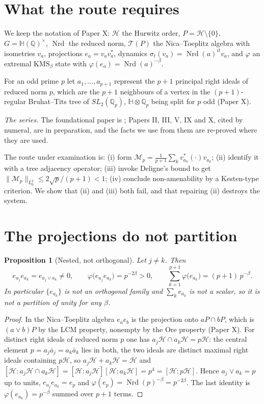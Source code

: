 \documentclass[11pt]{amsart}
\numberwithin{equation}{section}
\newtheorem{proposition}[theorem]{Proposition}
\theoremstyle{definition}
\theoremstyle{remark}
\newcommand{\Q}{\mathbb{Q}}
\newcommand{\HH}{\mathbb{H}}
\newcommand{\cH}{\mathcal{H}}
\newcommand{\cT}{\mathcal{T}}
\newcommand{\cM}{\mathcal{M}}
\newcommand{\Nrd}{\operatorname{Nrd}}
\begin{document}
\maketitle

\section{What the route requires}

We keep the notation of Paper X: $\cH$ the Hurwitz order, $P=\cH\setminus\{0\}$,
$G=\HH(\Q)^\times$, $\Nrd$ the reduced norm, $\cT(P)$ the Nica--Toeplitz algebra with
isometries $v_a$, projections $e_a=v_av_a^*$, dynamics $\sigma_t(v_a)=\Nrd(a)^{it}v_a$, and
$\varphi$ an extremal $\mathrm{KMS}_\beta$ state with $\varphi(e_a)=\Nrd(a)^{-\beta}$.

For an odd prime $p$ let $a_1,\dots,a_{p+1}$ represent the $p+1$ principal right ideals of
reduced norm $p$, which are the $p+1$ neighbours of a vertex in the $(p+1)$-regular
Bruhat--Tits tree of $SL_2(\Q_p)$, $\HH\otimes\Q_p$ being split for $p$ odd (Paper X).

\emph{The series.} The foundational paper is \cite{Main}; Papers II, III, V, IX and X, cited
by numeral, are in preparation, and the facts we use from them are re-proved where they
are used.

The route under examination is: (i) form
$\cM_p=\frac{1}{p+1}\sum_kv_{a_k}^*(\cdot)v_{a_k}$; (ii) identify it with a tree adjacency
operator; (iii) invoke Deligne's bound to get
$\|\cM_p\|_{L^2_0}\le2\sqrt p/(p+1)<1$; (iv) conclude non-amenability by a Kesten-type
criterion. We show that (ii) and (iii) both fail, and that repairing (ii) destroys the
system.

\section{The projections do not partition}

\begin{proposition}[Nested, not orthogonal]\label{prop:nested}
Let $j\ne k$. Then
\[
e_{a_j}e_{a_k}=e_{a_j\vee a_k}\ne0,\qquad
\varphi\bigl(e_{a_j}e_{a_k}\bigr)=p^{-2\beta}>0,
\qquad
\sum_{k=1}^{p+1}\varphi\bigl(e_{a_k}\bigr)=(p+1)\,p^{-\beta}.
\]
In particular $\{e_{a_k}\}$ is not an orthogonal family and $\sum_ke_{a_k}$ is not a scalar,
so it is not a partition of unity for any $\beta$.
\end{proposition}

\begin{proof}
In the Nica--Toeplitz algebra $e_ae_b$ is the projection onto $aP\cap bP$, which is
$(a\vee b)P$ by the LCM property, nonempty by the Ore property (Paper X). For distinct right
ideals of reduced norm $p$ one has $a_j\cH\cap a_k\cH=p\cH$: the central element
$p=a_j\bar a_j=a_k\bar a_k$ lies in both, the two ideals are distinct maximal right ideals
containing $p\cH$, so $a_j\cH+a_k\cH=\cH$ and $[\cH:a_j\cH\cap a_k\cH]=[\cH:a_j\cH][\cH:a_k\cH]=p^4=[\cH:p\cH]$.
Hence $a_j\vee a_k=p$ up to units, $e_{a_j}e_{a_k}=e_p$ and $\varphi(e_p)=\Nrd(p)^{-\beta}=p^{-2\beta}$.
The last identity is $\varphi(e_{a_k})=p^{-\beta}$ summed over $p+1$ terms.
\end{proof}
\end{document}
